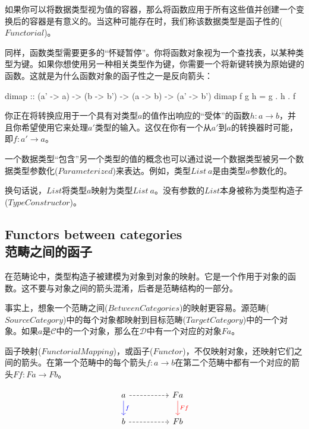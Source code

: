 \documentclass[DaoFP]{subfiles}
\begin{document}
    如果你可以将数据类型视为值的容器，那么将函数应用于所有这些值并创建一个变换后的容器是有意义的。当这种可能存在时，我们称该数据类型是函子性的($Functorial$)。

    同样，函数类型需要更多的“怀疑暂停”。你将函数对象视为一个查找表，以某种类型为键。如果你想使用另一种相关类型作为键，你需要一个将新键转换为原始键的函数。这就是为什么函数对象的函子性之一是反向箭头：

    \begin{haskell}
        dimap :: (a' -> a) -> (b -> b') -> (a -> b) -> (a' -> b')
        dimap f g h = g . h . f
    \end{haskell}

    你正在将转换应用于一个具有对类型$a$的值作出响应的“受体”的函数$h \colon a \to b$，并且你希望使用它来处理$a'$类型的输入。这仅在你有一个从$a'$到$a$的转换器时可能，即$f \colon a' \to a$。

    一个数据类型“包含”另一个类型的值的概念也可以通过说一个数据类型被另一个数据类型参数化($Parameterized$)来表达。例如，类型$List\ a$是由类型$a$参数化的。

    换句话说，$List$将类型$a$映射为类型$List\ a$。没有参数的$List$本身被称为类型构造子($Type Constructor$)。

    \subsection{Functors between categories\\范畴之间的函子}

    在范畴论中，类型构造子被建模为对象到对象的映射。它是一个作用于对象的函数。这不要与对象之间的箭头混淆，后者是范畴结构的一部分。

    事实上，想象一个范畴之间($Between Categories$)的映射更容易。源范畴($Source Category$)中的每个对象都映射到目标范畴($Target Category$)中的一个对象。如果$a$是$\mathcal{C}$中的一个对象，那么在$\mathcal{D}$中有一个对应的对象$F a$。

    函子映射($Functorial Mapping$)，或函子($Functor$)，不仅映射对象，还映射它们之间的箭头。在第一个范畴中的每个箭头$f \colon a \to b$在第二个范畴中都有一个对应的箭头$F f \colon F a \to F b$。

    \[
        \begin{tikzcd}
            a
            \arrow[d, blue, "f"]
            \arrow[rr, dashed]
            && F a
            \arrow[d, red, "F f"]
            \\
            b
            \arrow[rr, dashed]
            && F b
        \end{tikzcd}
    \]
\end{document}
